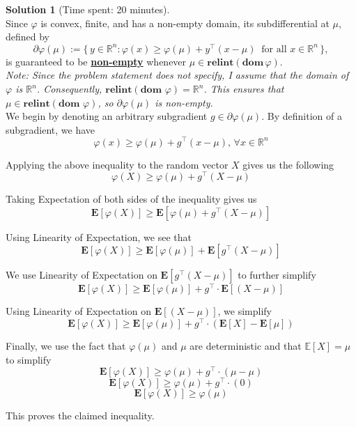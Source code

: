 \documentclass[11pt, reqno, letterpaper, twoside]{amsart}
\theoremstyle{plain}
\theoremstyle{definition}
\newtheorem{solution}[theorem]{Solution}
\begin{document}
\clearpage
\begin{solution}[Time spent: 20 minutes] \\
Since $\varphi$ is convex, finite, and has a non-empty domain, its subdifferential at $\mu$, defined by  
\[
\partial \varphi(\mu) := \{\, y \in \mathbb{R}^n : \varphi(x) \geq \varphi(\mu) + y^\top (x - \mu) \;\; \text{for all } x \in \mathbb{R}^n \,\},
\]  
is guaranteed to be \textbf{\underline{non-empty}} whenever $\mu \in \textbf{relint}(\textbf{dom}\,\varphi)$. \\


\noindent \textit{Note: Since the problem statement does not specify, I assume that the domain of $\varphi$ is $\mathbb{R}^n$. Consequently, $\textbf{relint}(\textbf{dom } \varphi) = \mathbb{R}^n$. This ensures that $\mu \in \textbf{relint}(\textbf{dom } \varphi)$, so $\partial \varphi(\mu)$ is non-empty.} \\

\noindent We begin by denoting an arbitrary subgradient $g \in \partial \varphi(\mu)$. By definition of a subgradient, we have
\[
\varphi(x)\ge \varphi(\mu)+ g^\top \left(x-\mu\right),\, \forall x \in \mathbb{R}^n
\]

Applying the above inequality to the random vector \(X\) gives us the following
\[
\varphi(X)\ge \varphi(\mu)+ g^\top \left(X-\mu\right)
\]

Taking Expectation of both sides of the inequality gives us 
\[
\mathbf{E} \left[ \varphi(X) \right]\ge \mathbf{E} \left[ \varphi(\mu)+ g^\top \left(X-\mu\right) \right]
\]

Using Linearity of Expectation, we see that
\[
\mathbf{E} \left[ \varphi(X) \right]\ge \mathbf{E} \left[ \varphi(\mu) \right] + \mathbf{E} \left[ g^\top \left(X-\mu\right) \right]
\]

We use Linearity of Expectation on $\mathbf{E} \left[ g^\top \left(X-\mu\right) \right]$ to further simplify
\[
\mathbf{E} \left[ \varphi(X) \right]\ge \mathbf{E} \left[ \varphi(\mu) \right] + g^\top \cdot \mathbf{E} \left[\left(X-\mu\right) \right]
\]

Using Linearity of Expectation on $\mathbf{E} \left[\left(X-\mu\right) \right]$, we simplify 
\[
\mathbf{E} \left[ \varphi(X) \right]\ge \mathbf{E} \left[ \varphi(\mu) \right] + g^\top \cdot \left( \mathbf{E} \left[X \right] - \mathbf{E} \left[\mu \right] \right)
\]

Finally, we use the fact that $\varphi(\mu)$ and $\mu$ are deterministic and that \(\mathbb{E}[X]=\mu\) to simplify
\[
\mathbf{E} \left[ \varphi(X) \right]\ge \varphi(\mu) + g^\top \cdot \left( \mu - \mu \right)
\]
\[
\mathbf{E} \left[ \varphi(X) \right]\ge \varphi(\mu) + g^\top \cdot \left( 0 \right)
\]
\[
\mathbf{E} \left[ \varphi(X) \right]\ge \varphi(\mu)
\]

This proves the claimed inequality.

\end{solution}
\end{document}
